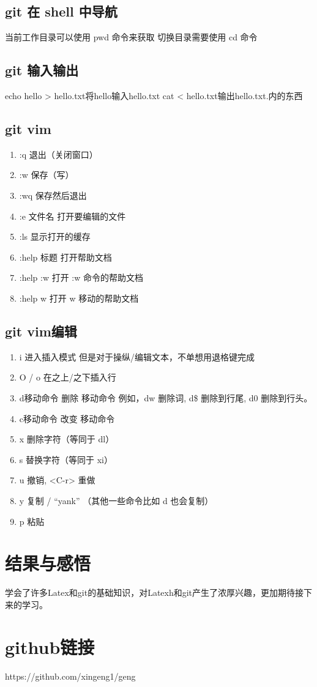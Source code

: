 \documentclass{article}
\begin{document}
\subsection{git 在 shell 中导航}
当前工作目录可以使用 pwd 命令来获取\newline
切换目录需要使用 cd 命令
\subsection{git 输入输出}
echo hello > hello.txt将hello输入hello.txt\newline
cat < hello.txt输出hello.txt.内的东西
\subsection{git vim}
\begin{enumerate}
\item :q 退出（关闭窗口）
\item :w 保存（写）
\item :wq 保存然后退出
\item :e {文件名} 打开要编辑的文件
\item  :ls 显示打开的缓存
\item :help {标题} 打开帮助文档
\item :help :w 打开 :w 命令的帮助文档
\item :help w 打开 w 移动的帮助文档
\end{enumerate}
\subsection{git vim编辑}
\begin{enumerate}
\item i 进入插入模式
但是对于操纵/编辑文本，不单想用退格键完成
\item O / o 在之上/之下插入行
\item d{移动命令} 删除 {移动命令}
例如，dw 删除词, d\$ 删除到行尾, d0 删除到行头。
\item c{移动命令} 改变 {移动命令}
\item x 删除字符（等同于 dl）
\item s 替换字符（等同于 xi）
\item u 撤销, <C-r> 重做
\item y 复制 / “yank” （其他一些命令比如 d 也会复制）
\item p 粘贴
\end{enumerate}
\section{ \LARGE 结果与感悟}
学会了许多Latex和git的基础知识，对Latexh和git产生了浓厚兴趣，更加期待接下来的学习。
\section{ \LARGE github链接}
https://github.com/xingeng1/geng
\end{document}
